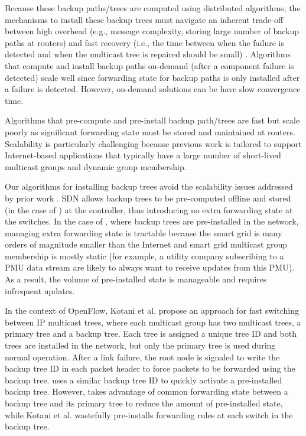 Because these backup paths/trees are computed using distributed algorithms, the mechanisms to install these backup trees must navigate an inherent trade-off between high overhead
(e.g., message complexity, storing large number of backup paths at routers) and fast recovery (i.e., the time between when the failure is detected and when the multicast tree is repaired
should be small) \cite{Cui04}.  Algorithms that compute and install backup paths on-demand (after a component failure is detected) scale well since forwarding state for backup paths is only
installed after a failure is detected.  However, on-demand solutions can be have slow convergence time. %

Algorithms that pre-compute and pre-install backup path/trees are fast but scale poorly as significant forwarding state must be stored and maintained at routers. 
Scalability is particularly challenging because previous work  \cite{Cui04,Fei01,Kodialam02,Lau05,Li06,Luebben09,Medard99,Pointurier02,Wu97} is tailored to support Internet-based applications that 
typically have a large number of short-lived multicast groups and dynamic group membership. %

Our algorithms for installing backup trees avoid the scalability issues addressed by prior work \cite{Cui04,Fei01,Medard99}.  SDN allows backup trees to be pre-computed offline and stored (in the
case of \posts) at the controller, thus introducing no extra forwarding state at the switches.  In the case of \pres, where backup trees are pre-installed in the network, managing
extra forwarding state is tractable because  
the smart grid is many orders of magnitude smaller than the Internet and smart grid multicast group membership is mostly static \cite{Bakken11}
(for example, a utility company subscribing to a PMU data stream are likely to always want to receive updates from this PMU).  As a result, the volume of pre-installed state is manageable and 
requires infrequent updates.

In the context of OpenFlow, Kotani et al. \cite{Kotani12} propose an approach for fast switching between IP multicast trees, where 
each multicast group has two multicast trees, a primary tree and a backup tree.  
Each tree is assigned a unique tree ID and both trees are installed in the network, but only the primary tree is used during normal operation.  
After a link failure, the root node is signaled to write the backup tree ID in each packet header to force packets to be forwarded using the backup tree.  \pre uses a similar 
backup tree ID to quickly activate a pre-installed backup tree.  However, \pre takes advantage of common forwarding state between a backup tree and its primary tree to reduce
the amount of pre-installed state, while Kotani et al. \cite{Kotani12} wastefully pre-installs forwarding rules at each switch in the backup tree.  


